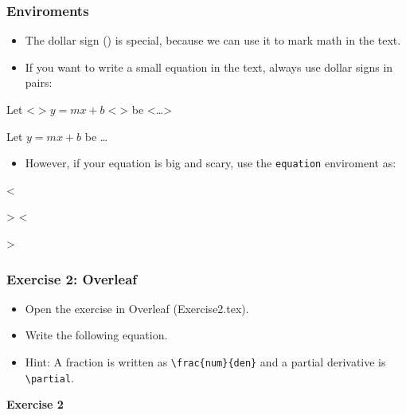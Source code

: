 \begin{frame}[fragile]
\frametitle{Enviroments}
\begin{itemize}
\item The dollar sign (\color{red}{\$}\color{black}{}) is special, because we can use it to mark math in the text.\\
\item If you want to write a small equation in the text, always use dollar signs in pairs:
\end{itemize}
\begin{framed}
\begin{minipage}[b]{.4\textwidth}
\begin{verbnobox}[\vbdelim]
Let <$>y=mx+b<$> be <\ldots>
\end{verbnobox}
\end{minipage}%
\end{framed}
\begin{framed}
\begin{minipage}[b]{.4\textwidth}
Let $y=mx+b$ be \ldots
\end{minipage}
\end{framed}
\begin{itemize}
\item However, if your equation is big and scary, use the \verb|equation| enviroment as: 
\end{itemize}

\begin{verbnobox}[\vbdelim]
<\begin{>equation<}>
<\end{>equation<}>
\end{verbnobox}
\end{frame}

\begin{frame}[fragile]
\frametitle{Exercise 2: Overleaf}
\begin{itemize}
\item Open the exercise in Overleaf (Exercise2.tex).
\item Write the following equation.
\item  Hint: A fraction is written as \verb|\frac{num}{den}| and a partial derivative is \verb|\partial|.
\end{itemize}

\textbf{Exercise 2}
\noindent{}
\end{frame}

